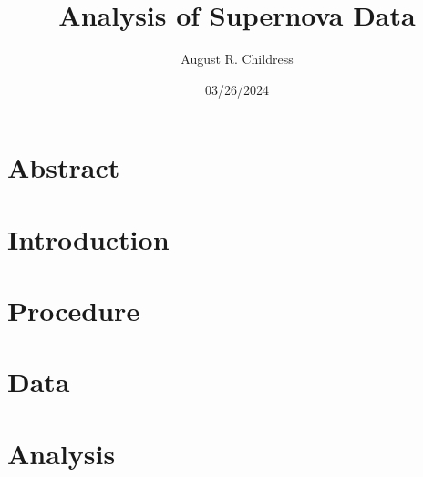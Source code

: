 \documentclass{article}
\author{August R. Childress}
\title{Analysis of Supernova Data}
\date{03/26/2024}
\begin{document}
\maketitle

\section{Abstract}


\section{Introduction}


\section{Procedure}


\section{Data}


\section{Analysis}




\end{document}
